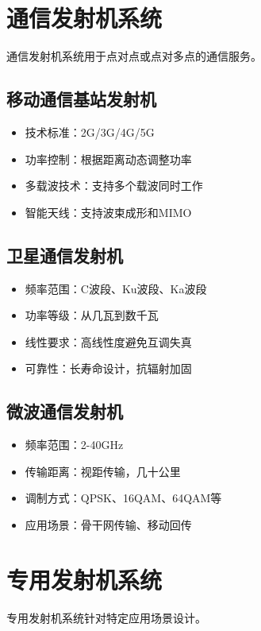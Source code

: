 \documentclass[12pt,UTF8]{ctexbook}
\begin{document}
\section{通信发射机系统}

通信发射机系统用于点对点或点对多点的通信服务。

\subsection{移动通信基站发射机}
\begin{itemize}[leftmargin=3.5em]
    \item 技术标准：2G/3G/4G/5G
    \item 功率控制：根据距离动态调整功率
    \item 多载波技术：支持多个载波同时工作
    \item 智能天线：支持波束成形和MIMO
\end{itemize}

\subsection{卫星通信发射机}
\begin{itemize}[leftmargin=3.5em]
    \item 频率范围：C波段、Ku波段、Ka波段
    \item 功率等级：从几瓦到数千瓦
    \item 线性要求：高线性度避免互调失真
    \item 可靠性：长寿命设计，抗辐射加固
\end{itemize}

\subsection{微波通信发射机}
\begin{itemize}[leftmargin=3.5em]
    \item 频率范围：2-40GHz
    \item 传输距离：视距传输，几十公里
    \item 调制方式：QPSK、16QAM、64QAM等
    \item 应用场景：骨干网传输、移动回传
\end{itemize}

\section{专用发射机系统}

专用发射机系统针对特定应用场景设计。
\end{document}
